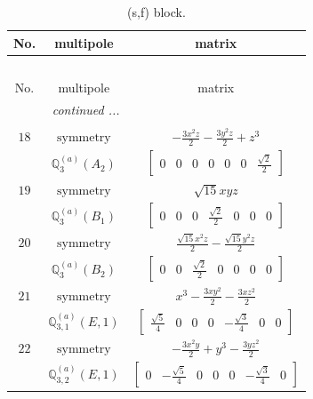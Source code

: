\documentclass[fleqn,8pt,landscape]{jsarticle}
\begin{document}
\begin{longtable}{ccc}
\caption{(s,f) block.}
 \\
 \hline \hline
No. & multipole & matrix \\ \hline \endfirsthead

\multicolumn{2}{l}{\tablename\ \thetable{}} \\
 \hline \hline
No. & multipole & matrix \\ \hline \endhead

 \hline \hline
\multicolumn{2}{r}{\footnotesize\it continued ...} \\ \endfoot

 \hline \hline
\multicolumn{2}{r}{} \\ \endlastfoot

$ 18 $ & $ \text{symmetry} $ & $ - \frac{3 x^{2} z}{2} - \frac{3 y^{2} z}{2} + z^{3} $ \\
$  $ & $ \mathbb{Q}_{3}^{(a)}(A_{2}) $ & $ \begin{bmatrix} 0 & 0 & 0 & 0 & 0 & 0 & \frac{\sqrt{2}}{2} \end{bmatrix} $ \\ \hline
$ 19 $ & $ \text{symmetry} $ & $ \sqrt{15} x y z $ \\
$  $ & $ \mathbb{Q}_{3}^{(a)}(B_{1}) $ & $ \begin{bmatrix} 0 & 0 & 0 & \frac{\sqrt{2}}{2} & 0 & 0 & 0 \end{bmatrix} $ \\ \hline
$ 20 $ & $ \text{symmetry} $ & $ \frac{\sqrt{15} x^{2} z}{2} - \frac{\sqrt{15} y^{2} z}{2} $ \\
$  $ & $ \mathbb{Q}_{3}^{(a)}(B_{2}) $ & $ \begin{bmatrix} 0 & 0 & \frac{\sqrt{2}}{2} & 0 & 0 & 0 & 0 \end{bmatrix} $ \\ \hline
$ 21 $ & $ \text{symmetry} $ & $ x^{3} - \frac{3 x y^{2}}{2} - \frac{3 x z^{2}}{2} $ \\
$  $ & $ \mathbb{Q}_{3,1}^{(a)}(E,1) $ & $ \begin{bmatrix} \frac{\sqrt{5}}{4} & 0 & 0 & 0 & - \frac{\sqrt{3}}{4} & 0 & 0 \end{bmatrix} $ \\ \hline
$ 22 $ & $ \text{symmetry} $ & $ - \frac{3 x^{2} y}{2} + y^{3} - \frac{3 y z^{2}}{2} $ \\
$  $ & $ \mathbb{Q}_{3,2}^{(a)}(E,1) $ & $ \begin{bmatrix} 0 & - \frac{\sqrt{5}}{4} & 0 & 0 & 0 & - \frac{\sqrt{3}}{4} & 0 \end{bmatrix} $ \\ \hline

\end{longtable}
\end{document}
